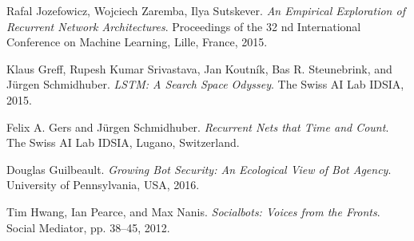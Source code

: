 \documentclass[12pt]{article}
\begin{document}
	\begin{thebibliography}{9}
		Rafal Jozefowicz, Wojciech Zaremba, Ilya Sutskever. 
		\textit{An Empirical Exploration of Recurrent Network Architectures}. 
		Proceedings of the 32 nd International Conference on Machine Learning, Lille, France, 2015.
		 
		Klaus Greff, Rupesh Kumar Srivastava, Jan Koutn\'{i}k, Bas R. Steunebrink, and J\"{u}rgen Schmidhuber. 
		\textit{LSTM: A Search Space Odyssey}.
		The Swiss AI Lab IDSIA, 2015.
		 
		Felix A. Gers and J\"{u}rgen Schmidhuber. 
		\textit{Recurrent Nets that Time and Count}.
		The Swiss AI Lab IDSIA, Lugano, Switzerland. 
		
		Douglas Guilbeault. 
		\textit{Growing Bot Security: An Ecological View of Bot Agency}.
		University of Pennsylvania, USA, 2016. 
		
		Tim Hwang, Ian Pearce, and Max Nanis. 
		\textit{Socialbots: Voices from the Fronts}.
		Social Mediator, pp. 38–45, 2012. 
	\end{thebibliography}
	
\end{document}
